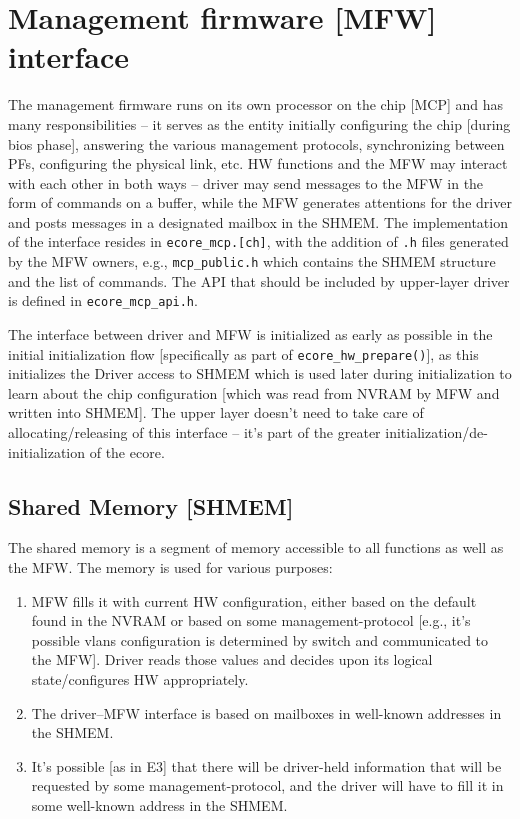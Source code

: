 \documentclass[11pt,fleqn,hidelinks,oneside]{book} %
\makeatletter
\newcommand{\myindex}[1]
	{\index{#1@\texttt{#1}}#1}
\makeatother
\begin{document}
\chapter{Management firmware [MFW] interface}
\label{cha:mfw}

The management firmware runs on its own processor on the chip [\myindex{MCP}] and has many responsibilities – it serves as the entity initially configuring the chip [during bios phase], answering the various management protocols, synchronizing between PFs, configuring the physical link, etc.
HW functions and the \myindex{MFW} may interact with each other in both ways – driver may send messages to the MFW in the form of commands on a buffer, while the MFW generates attentions for the driver and posts messages in a designated mailbox in the SHMEM. The implementation of the interface resides in \texttt{ecore\_mcp.[ch]}, with the addition of \texttt{.h} files generated by the MFW owners, e.g., \texttt{mcp\_public.h} which contains the SHMEM structure and the list of commands.
The API that should be included by upper-layer driver is defined in \texttt{ecore\_mcp\_api.h}.

The interface between driver and MFW is initialized as early as possible in the initial initialization flow [specifically as part of \texttt{ecore\_hw\_prepare()}],  as this initializes the Driver access to SHMEM which is used later during initialization to learn about the chip configuration [which was read from NVRAM by MFW and written into SHMEM].
The upper layer doesn’t need to take care of allocating/releasing of this interface – it’s part of the greater initialization/de-initialization of the ecore.

\section{Shared Memory [SHMEM]}
The \myindex{shared memory} is a segment of memory accessible to all functions as well as the MFW. The memory is used for various purposes:
\begin{enumerate}
	\item MFW fills it with current HW configuration, either based on the default found in the NVRAM or based on some management-protocol [e.g., it’s possible vlans configuration is determined by switch and communicated to the MFW]. Driver reads those values and decides upon its logical state/configures HW appropriately. \\
	
	\item The driver--MFW interface is based on mailboxes in well-known addresses in the SHMEM. \\
	
	\item It’s possible [as in E3] that there will be driver-held information that will be requested by some management-protocol, and the driver will have to fill it in some well-known address in the SHMEM.
\end{enumerate}
\end{document}
